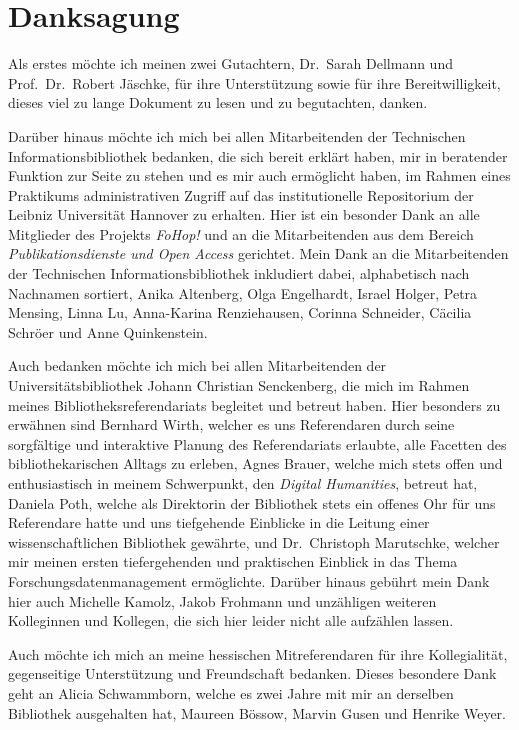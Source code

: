 \chapter{Danksagung}
Als erstes möchte ich meinen zwei Gutachtern, Dr.~Sarah Dellmann und Prof.~Dr.~Robert Jäschke, für ihre Unterstützung sowie für ihre Bereitwilligkeit, dieses viel zu lange Dokument zu lesen und zu begutachten, danken.

Darüber hinaus möchte ich mich bei allen Mitarbeitenden der Technischen Informationsbibliothek bedanken, die sich bereit erklärt haben, mir in beratender Funktion zur Seite zu stehen und es mir auch ermöglicht haben, im Rahmen eines Praktikums administrativen Zugriff auf das institutionelle Repositorium der Leibniz Universität Hannover zu erhalten.
Hier ist ein besonder Dank an alle Mitglieder des Projekts \textit{FoHop!} und an die Mitarbeitenden aus dem Bereich \textit{Publikationsdienste und Open Access} gerichtet.
Mein Dank an die Mitarbeitenden der Technischen Informationsbibliothek inkludiert dabei, alphabetisch nach Nachnamen sortiert, Anika Altenberg, Olga Engelhardt, Israel Holger, Petra Mensing, Linna Lu, Anna-Karina Renziehausen, Corinna Schneider, Cäcilia Schröer und Anne Quinkenstein.

Auch bedanken möchte ich mich bei allen Mitarbeitenden der Universitätsbibliothek Johann Christian Senckenberg, die mich im Rahmen meines Bibliotheksreferendariats begleitet und betreut haben.
Hier besonders zu erwähnen sind Bernhard Wirth, welcher es uns Referendaren durch seine sorgfältige und interaktive Planung des Referendariats erlaubte, alle Facetten des bibliothekarischen Alltags zu erleben, Agnes Brauer, welche mich stets offen und enthusiastisch in meinem Schwerpunkt, den \textit{Digital Humanities}, betreut hat, Daniela Poth, welche als Direktorin der Bibliothek stets ein offenes Ohr für uns Referendare hatte und uns tiefgehende Einblicke in die Leitung einer wissenschaftlichen Bibliothek gewährte, und Dr.~Christoph Marutschke, welcher mir meinen ersten tiefergehenden und praktischen Einblick in das Thema Forschungsdatenmanagement ermöglichte.
Darüber hinaus gebührt mein Dank hier auch Michelle Kamolz, Jakob Frohmann und unzähligen weiteren Kolleginnen und Kollegen, die sich hier leider nicht alle aufzählen lassen.

Auch möchte ich mich an meine hessischen Mitreferendaren für ihre Kollegialität, gegenseitige Unterstützung und Freundschaft bedanken.
Dieses besondere Dank geht an Alicia Schwammborn, welche es zwei Jahre mit mir an derselben Bibliothek ausgehalten hat, Maureen Bössow, Marvin Gusen und Henrike Weyer.


